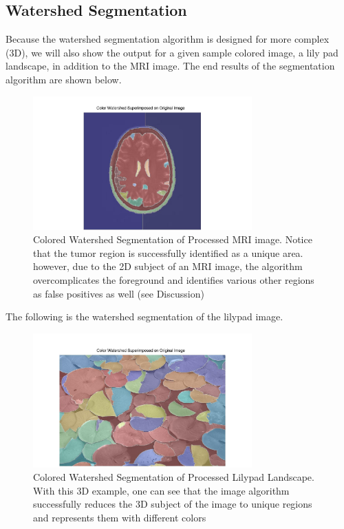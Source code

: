 \documentclass[12pt]{article}
\theoremstyle{plain}%
\theoremstyle{definition}
\theoremstyle{remark}
\begin{document}
\subsection{Watershed Segmentation}

Because the watershed segmentation algorithm is designed for more complex (3D), we will also show the output for a given sample colored image, a lily pad landscape, in addition to the MRI image. The end results of the segmentation algorithm are shown below.

\begin{figure}[!h]
	\centering
		\includegraphics[width=0.75\textwidth]{MRIresult.jpg}
	\caption{Colored Watershed Segmentation of Processed MRI image.  Notice that the tumor region is successfully identified as a unique area.  however, due to the 2D subject of an MRI image, the algorithm overcomplicates the foreground and identifies various other regions as false positives as well (see Discussion)}
\end{figure}

The following is the watershed segmentation of the lilypad image.

\begin{figure}[!h]
	\centering
		\includegraphics[width=0.75\textwidth]{result.jpg}
	\caption{Colored Watershed Segmentation of Processed Lilypad Landscape.  With this 3D example, one can see that the image algorithm successfully reduces the 3D subject of the image to unique regions and represents them with different colors}
\end{figure}
\end{document}
